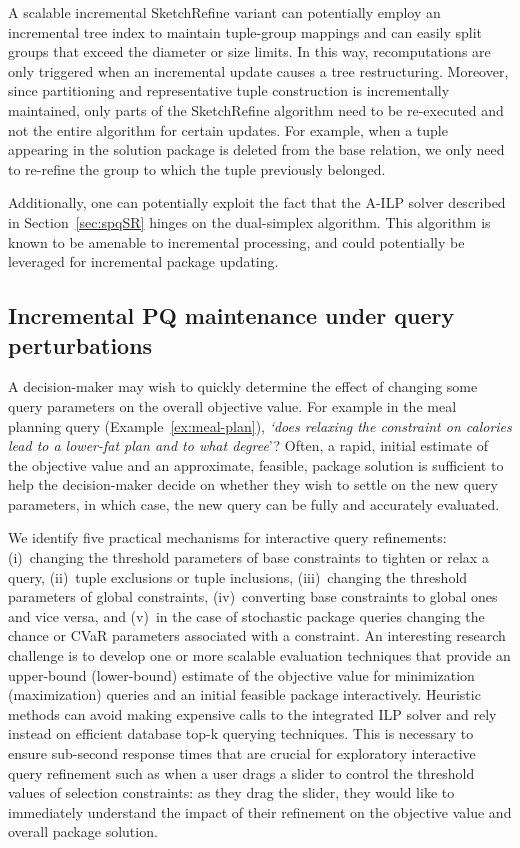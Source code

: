 \documentclass[11pt]{article}
\newcommand{\skref}{{\sc SketchRefine}\xspace}
\begin{document}
A scalable incremental \skref variant can potentially employ an incremental tree index to maintain tuple-group mappings and can easily split groups that exceed the diameter or size limits. In this way, recomputations are only triggered when an incremental update causes a tree restructuring. Moreover, since partitioning and representative tuple construction is incrementally maintained, only parts of the \skref algorithm need to be re-executed and not the entire algorithm for certain updates. For example, when a tuple appearing in the solution package is deleted from the base relation, we only need to re-refine the group to which the tuple previously belonged.

Additionally, one can potentially exploit the fact that the A-ILP solver described in Section~\ref{sec:spqSR} hinges on the dual-simplex algorithm. This algorithm is known to be amenable to incremental processing, and could potentially be leveraged for incremental package updating.

\subsection{Incremental PQ maintenance under query perturbations}
\label{sec:deltaQuery}

A decision-maker may wish to quickly determine the effect of changing some query parameters on the overall objective value. For example in the meal planning query (Example~\ref{ex:meal-plan}), \emph{`does relaxing the constraint on calories lead to a lower-fat plan and to what degree}'? Often, a rapid, initial estimate of the objective value and an approximate, feasible, package solution is sufficient to help the decision-maker decide on whether they wish to settle on the new query parameters, in which case, the new query can be fully and accurately evaluated.

We identify five practical mechanisms for interactive query refinements: (i)~changing the threshold parameters of base constraints to tighten or relax a query, (ii)~tuple exclusions or tuple inclusions, (iii)~changing the threshold parameters of global constraints, (iv)~converting base constraints to global ones and vice versa, and (v)~in the case of stochastic package queries changing the chance or CVaR parameters associated with a constraint. An interesting research challenge is to  develop one or more scalable evaluation techniques that provide an upper-bound (lower-bound) estimate of the objective value for minimization (maximization) queries and an initial feasible package interactively. Heuristic methods can avoid making expensive calls to the integrated ILP solver and rely instead on efficient database top-k querying techniques. This is necessary to ensure sub-second response times that are crucial for exploratory interactive query refinement such as when a user drags a slider to control the threshold values of selection constraints: as they drag the slider, they would like to immediately understand the impact of their refinement on the objective value and overall package solution.
\end{document}
